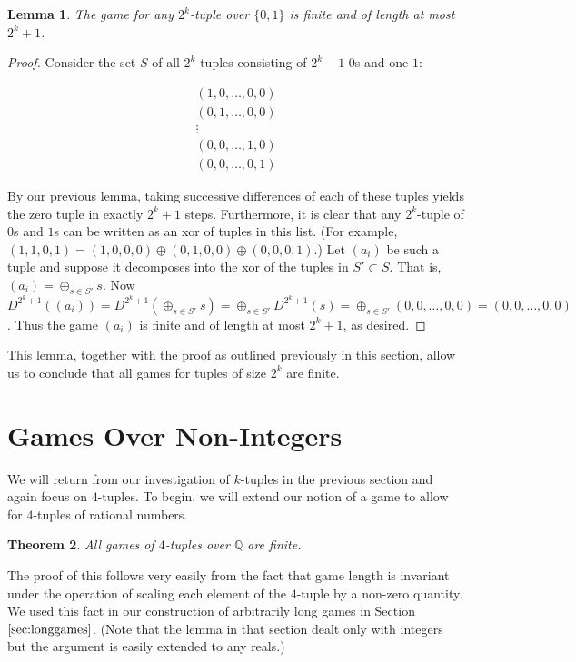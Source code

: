\documentclass[12pt]{amsart}
\newtheorem{theorem}{Theorem}[section]
\newtheorem{lemma}[theorem]{Lemma}
\newcommand{\xor}{\oplus}
\begin{document}
\begin{lemma}
The game for any $2^k$-tuple over $\{0,1\}$ is finite and of length at most $2^k+1$.
\end{lemma}

\begin{proof}
Consider the set $S$ of all $2^k$-tuples consisting of $2^k-1$ $0$s and one $1$:

$$\begin{array}{c}
(1,0,\ldots,0,0) \\
(0,1,\ldots,0,0) \\
\vdots \\
(0,0,\ldots,1,0) \\
(0,0,\ldots,0,1)
\end{array}$$

By our previous lemma, taking successive differences of each of these tuples yields the zero tuple in exactly $2^k+1$ steps. Furthermore, it is clear that any $2^k$-tuple of $0$s and $1$s can be written as an xor of tuples in this list. (For example, $(1,1,0,1)=(1,0,0,0)\xor(0,1,0,0)\xor(0,0,0,1)$.) Let $(a_i)$ be such a tuple and suppose it decomposes into the xor of the tuples in $S'\subset S$. That is, $(a_i)=\xor_{s\in S'} s$. Now $D^{2^k+1}((a_i))=D^{2^k+1}(\xor_{s\in S'} s)=\xor_{s\in S'} D^{2^k+1}(s)=\xor_{s\in S'} (0,0,\ldots,0,0) = (0,0,\ldots,0,0)$. Thus the game $(a_i)$ is finite and of length at most $2^k+1$, as desired.
\end{proof}

This lemma, together with the proof as outlined previously in this section, allow us to conclude that all games for tuples of size $2^k$ are finite.

\section{Games Over Non-Integers}

We will return from our investigation of $k$-tuples in the previous section and again focus on $4$-tuples. To begin, we will extend our notion of a game to allow for $4$-tuples of rational numbers.

\begin{theorem}
All games of $4$-tuples over $\mathbb{Q}$ are finite.
\end{theorem}

The proof of this follows very easily from the fact that game length is invariant under the operation of scaling each element of the $4$-tuple by a non-zero quantity. We used this fact in our construction of arbitrarily long games in Section $\ref{sec:longgames}$. (Note that the lemma in that section dealt only with integers but the argument is easily extended to any reals.)
\end{document}
